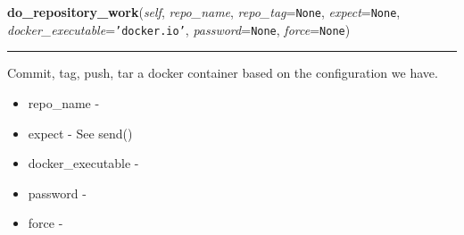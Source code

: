\hspace{.8\funcindent}\begin{boxedminipage}{\funcwidth}

    \raggedright \textbf{do\_repository\_work}(\textit{self}, \textit{repo\_name}, \textit{repo\_tag}={\tt None}, \textit{expect}={\tt None}, \textit{docker\_executable}={\tt \texttt{'}\texttt{docker.io}\texttt{'}}, \textit{password}={\tt None}, \textit{force}={\tt None})

    \vspace{-1.5ex}

    \rule{\textwidth}{0.5\fboxrule}
\setlength{\parskip}{2ex}
    Commit, tag, push, tar a docker container based on the configuration we
    have.

    \begin{itemize}
    \setlength{\parskip}{0.6ex}
      \item repo\_name         -

      \item expect            - See send()

      \item docker\_executable -

      \item password          -

      \item force             -

    \end{itemize}

\setlength{\parskip}{1ex}
    \end{boxedminipage}

    \label{shutit_global:ShutIt:get_config}

    \vspace{0.5ex}

